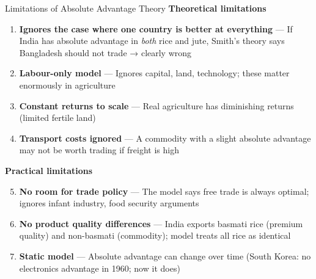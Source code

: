 \documentclass[
  ignorenonframetext,
  aspectratio=169,
]{beamer}
\makeatletter
\providecommand{\tightlist}{%
  \setlength{\itemsep}{0pt}\setlength{\parskip}{0pt}}
\let\quarto@originallabel\label
\DeclareRobustCommand*{\label}[1]{\quarto@originallabel{#1}}
\makeatother
\begin{document}
\begin{frame}{Limitations of Absolute Advantage Theory}
\label{limitations-of-absolute-advantage-theory}
\textbf{Theoretical limitations}

\begin{enumerate}
\tightlist
\item
  \textbf{Ignores the case where one country is better at everything}
  --- If India has absolute advantage in \emph{both} rice and jute,
  Smith's theory says Bangladesh should not trade → clearly wrong
\item
  \textbf{Labour-only model} --- Ignores capital, land, technology;
  these matter enormously in agriculture
\item
  \textbf{Constant returns to scale} --- Real agriculture has
  diminishing returns (limited fertile land)
\item
  \textbf{Transport costs ignored} --- A commodity with a slight
  absolute advantage may not be worth trading if freight is high
\end{enumerate}

\textbf{Practical limitations}

\begin{enumerate}
\setcounter{enumi}{4}
\tightlist
\item
  \textbf{No room for trade policy} --- The model says free trade is
  always optimal; ignores infant industry, food security arguments
\item
  \textbf{No product quality differences} --- India exports basmati rice
  (premium quality) and non-basmati (commodity); model treats all rice
  as identical
\item
  \textbf{Static model} --- Absolute advantage can change over time
  (South Korea: no electronics advantage in 1960; now it does)
\end{enumerate}

\end{frame}
\end{document}
